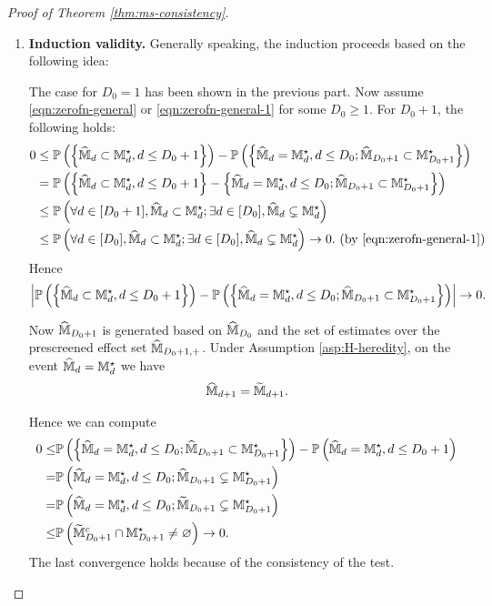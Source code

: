 \documentclass[12pt]{article}
\begin{document}
{\begin{proof}[Proof of Theorem \ref{thm:ms-consistency}]
\begin{enumerate}
    
    
    \item \textbf{Induction validity.}
    Generally speaking, the induction proceeds based on the following idea:
    

    
    The case for $D_0=1$ has been shown in the previous part. Now assume \eqref{eqn:zerofn-general} or \eqref{eqn:zerofn-general-1} for some $D_0\ge1$.  For $D_0+1$, 
    the following holds:
    \begin{align*} 
        0&\le {\mathbb{P}}\left(\left\{\widehat{{\mathbb{M}}}_d\subset{\mathbb{M}}^\star_d, d\le D_0+1\right\}\right)-{\mathbb{P}}\left(\left\{\widehat{{\mathbb{M}}}_d={\mathbb{M}}^\star_d, d\le D_0; \widehat{{\mathbb{M}}}_{D_0+1}\subset{\mathbb{M}}^\star_{D_0+1}\right\}\right) \\
        &= {\mathbb{P}}\left(\left\{\widehat{{\mathbb{M}}}_d\subset{\mathbb{M}}^\star_d, d\le D_0+1\right\} - \left\{\widehat{{\mathbb{M}}}_d={\mathbb{M}}^\star_d, d\le D_0; \widehat{{\mathbb{M}}}_{D_0+1}\subset{\mathbb{M}}^\star_{D_0+1}\right\}\right)\notag\\
        &\le {\mathbb{P}}\left(\forall d\in[D_0+1], \widehat{{\mathbb{M}}}_{d}\subset{\mathbb{M}}^\star_{d}; \exists d\in[D_0], \widehat{{\mathbb{M}}}_d\subsetneq{\mathbb{M}}^\star_d\right)\notag\\
        &\le {\mathbb{P}}\left(\forall d\in[D_0], \widehat{{\mathbb{M}}}_{d}\subset{\mathbb{M}}^\star_{d};\exists d\in[D_0], \widehat{{\mathbb{M}}}_d\subsetneq{\mathbb{M}}^\star_d\right)\to 0.\text{ (by \eqref{eqn:zerofn-general-1})}
    \end{align*}
    Hence
    \begin{align}\label{eqn:zerofun-general-2}
        \left|{\mathbb{P}}\left(\left\{\widehat{{\mathbb{M}}}_d\subset{\mathbb{M}}^\star_d, d\le D_0+1\right\}\right) - 
        {\mathbb{P}}\left(\left\{\widehat{{\mathbb{M}}}_d={\mathbb{M}}^\star_d, d\le D_0; \widehat{{\mathbb{M}}}_{D_0+1}\subset{\mathbb{M}}^\star_{D_0+1}\right\}\right)\right| \to 0.
    \end{align}
    
    Now $\widehat{{\mathbb{M}}}_{D_0+1}$ is generated based on $\widehat{{\mathbb{M}}}_{D_0}$ and the set of estimates over the prescreened effect set  $\widehat{{\mathbb{M}}}_{D_0+1,+}$. Under Assumption \ref{asp:H-heredity}, on the event $\widehat{{\mathbb{M}}}_d = {\mathbb{M}}_d^\star$ we have
    \begin{align*}
        \widehat{{\mathbb{M}}}_{d+1} = \widetilde{{\mathbb{M}}}_{d+1}.
    \end{align*}
    
    Hence we can compute
    \begin{align*}
        0\le& {\mathbb{P}}\left(\left\{\widehat{{\mathbb{M}}}_d={\mathbb{M}}^\star_d, d\le D_0; \widehat{{\mathbb{M}}}_{D_0+1}\subset{\mathbb{M}}^\star_{D_0+1}\right\}\right) - {\mathbb{P}}\left(\widehat{{\mathbb{M}}}_d={\mathbb{M}}^\star_d, d\le D_0+1\right)\\
        = & {\mathbb{P}}\left(\widehat{{\mathbb{M}}}_d={\mathbb{M}}^\star_d, d\le D_0; \widehat{{\mathbb{M}}}_{D_0+1}\subsetneq {\mathbb{M}}^{\star }_{D_0+1}\right) \\
        = & {\mathbb{P}}\left(\widehat{{\mathbb{M}}}_d={\mathbb{M}}^\star_d, d\le D_0; \widetilde{{\mathbb{M}}}_{D_0+1}\subsetneq {\mathbb{M}}^{\star }_{D_0+1}\right) \\
        \le&  {\mathbb{P}}\left(\widetilde{{\mathbb{M}}}^c_{D_0+1}\cap{\mathbb{M}}^{\star }_{D_0+1}\neq\varnothing\right)\to 0.
    \end{align*}
   The last convergence holds  because of the consistency of the test.
    

\end{enumerate}
\end{proof}}
\end{document}
